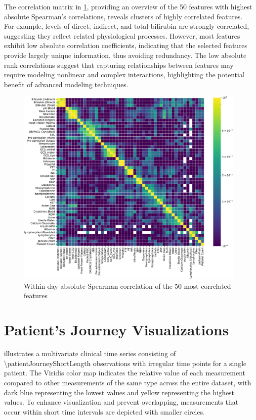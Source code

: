 The correlation matrix in \cref{fig:correlation_matrix}, providing an overview of the \num{50} features with highest absolute Spearman's correlations, reveals clusters of highly correlated features. For example, levels of direct, indirect, and total bilirubin are strongly correlated, suggesting they reflect related physiological processes. However, most features exhibit low absolute correlation coefficients, indicating that the selected features provide largely unique information, thus avoiding redundancy. The low absolute rank correlations suggest that capturing relationships between features may require modeling nonlinear and complex interactions, highlighting the potential benefit of advanced modeling techniques.

\begin{figure}
    \centering
    \includegraphics[width=\textwidth]{./figures/correlation_matrix}
    \caption[Spearman $\rho$]{Within-day absolute Spearman correlation of the 50 most correlated features}
    \label{fig:correlation_matrix}
\end{figure}


\section{Patient's Journey Visualizations}

 illustrates a multivariate clinical time series consisting of \num{\patientJourneyShortLength} observations with irregular time points for a single patient. The Viridis color map indicates the relative value of each measurement compared to other measurements of the same type across the entire dataset, with dark blue representing the lowest values and yellow representing the highest values. To enhance visualization and prevent overlapping, measurements that occur within short time intervals are depicted with smaller circles.

